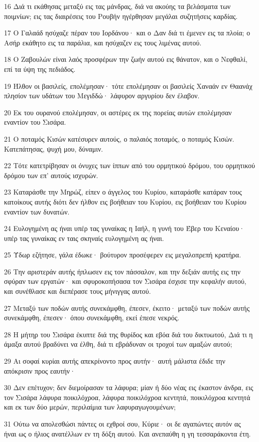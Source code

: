 \par 16 Διά τι εκάθησας μεταξύ εις τας μάνδρας, διά να ακούης τα βελάσματα των ποιμνίων; εις τας διαιρέσεις του Ρουβήν ηγέρθησαν μεγάλαι συζητήσεις καρδίας.
\par 17 Ο Γαλαάδ ησύχαζε πέραν του Ιορδάνου· και ο Δαν διά τι έμενεν εις τα πλοία; ο Ασήρ εκάθητο εις τα παράλια, και ησύχαζεν εις τους λιμένας αυτού.
\par 18 Ο Ζαβουλών είναι λαός προσφέρων την ζωήν αυτού εις θάνατον, και ο Νεφθαλί, επί τα ύψη της πεδιάδος.
\par 19 Ήλθον οι βασιλείς, επολέμησαν· τότε επολέμησαν οι βασιλείς Χαναάν εν Θαανάχ πλησίον των υδάτων του Μεγιδδώ· λάφυρον αργυρίου δεν έλαβον.
\par 20 Εκ του ουρανού επολέμησαν, οι αστέρες εκ της πορείας αυτών επολέμησαν εναντίον του Σισάρα.
\par 21 Ο ποταμός Κισών κατέσυρεν αυτούς, ο παλαιός ποταμός, ο ποταμός Κισών. Κατεπάτησας, ψυχή μου, δύναμιν.
\par 22 Τότε κατετρίβησαν οι όνυχες των ίππων από του ορμητικού δρόμου, του ορμητικού δρόμου των επ' αυτούς ισχυρών.
\par 23 Καταράσθε την Μηρώζ, είπεν ο άγγελος του Κυρίου, καταράσθε κατάραν τους κατοίκους αυτής διότι δεν ήλθον εις βοήθειαν του Κυρίου, εις βοήθειαν του Κυρίου εναντίον των δυνατών.
\par 24 Ευλογημένη ας ήναι υπέρ τας γυναίκας η Ιαήλ, η γυνή του Έβερ του Κεναίου· υπέρ τας γυναίκας εν ταις σκηναίς ευλογημένη ας ήναι.
\par 25 Ύδωρ εζήτησε, γάλα έδωκε· βούτυρον προσέφερεν εις μεγαλοπρεπή κρατήρα.
\par 26 Την αριστεράν αυτής ήπλωσεν εις τον πάσσαλον, και την δεξιάν αυτής εις την σφύραν των εργατών· και σφυροκοπήσασα τον Σισάρα έσχισε την κεφαλήν αυτού, και συνέθλασε και διεπέρασε τους μήνιγγας αυτού.
\par 27 Μεταξύ των ποδών αυτής συνεκάμφθη, έπεσεν, έκειτο· μεταξύ των ποδών αυτής συνεκάμφθη, έπεσεν· όπου συνεκάμφθη, εκεί έπεσε νεκρός.
\par 28 Η μήτηρ του Σισάρα έκυπτε διά της θυρίδος και εβόα διά του δικτυωτού, Διά τι η άμαξα αυτού βραδύνει να έλθη, διά τι εβράδυναν οι τροχοί των αμαξών αυτού;
\par 29 Αι σοφαί κυρίαι αυτής απεκρίνοντο προς αυτήν· αυτή μάλιστα έδιδε την απόκρισιν προς εαυτήν·
\par 30 Δεν επέτυχον; δεν διεμοίρασαν τα λάφυρα; μίαν ή δύο νέας εις έκαστον άνδρα, εις τον Σισάρα λάφυρα ποικιλόχροα, λάφυρα ποικιλόχροα κεντητά, ποικιλόχροα κεντητά και εκ των δύο μερών, περιλαίμια των λαφυραγωγουμένων;
\par 31 Ούτω να απολεσθώσι πάντες οι εχθροί σου, Κύριε· οι δε αγαπώντες αυτόν ας ήναι ως ο ήλιος ανατέλλων εν τη δόξη αυτού. Και ανεπαύθη η γη τεσσαράκοντα έτη.

